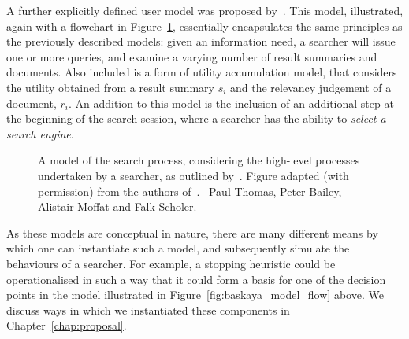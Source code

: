 A further explicitly defined user model was proposed by~\cite{thomas2014modelling_behaviour}. This model, illustrated, again with a flowchart in Figure~\ref{fig:thomas_model}, essentially encapsulates the same principles as the previously described models: given an information need, a searcher will issue one or more queries, and examine a varying number of result summaries and documents. Also included is a form of utility accumulation model, that considers the utility obtained from a result summary $s_i$ and the relevancy judgement of a document, $r_i$. An addition to this model is the inclusion of an additional step at the beginning of the search session, where a searcher has the ability to \emph{select a search engine}.

\begin{figure}[t!]
    \centering
    \caption[Model of the search process by~\cite{thomas2014modelling_behaviour}]{A model of the search process, considering the high-level processes undertaken by a searcher, as outlined by~\cite{thomas2014modelling_behaviour}. Figure adapted (with permission) from the authors of~\citealt{thomas2014modelling_behaviour}. \textcopyright~Paul Thomas, Peter Bailey, Alistair Moffat and Falk Scholer.}
    \label{fig:thomas_model}
\end{figure}

As these models are conceptual in nature, there are many different means by which one can instantiate such a model, and subsequently simulate the behaviours of a searcher. For example, a stopping heuristic could be operationalised in such a way that it could form a basis for one of the decision points in the model illustrated in Figure~\ref{fig:baskaya_model_flow} above. We discuss ways in which we instantiated these components in Chapter~\ref{chap:proposal}.

